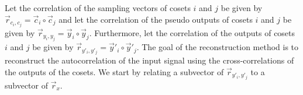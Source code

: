 \documentclass[a4paper, openany, oneside]{memoir}
\begin{document}
Let the correlation of the sampling vectors of cosets $i$ and $j$ be given by $\vec{r}_{c_i,c_j} = \vec{c}_i \circ \vec{c}_j$ and let the correlation of the pseudo outputs of cosets $i$ and $j$ be given by $\vec{r}_{y_i,y_j} = \vec{y}_i \circ \vec{y}_j$. Furthermore, let the correlation of the outputs of cosets $i$ and $j$ be given by $\vec{r}_{y'_i,y'_j} = \vec{y}'_i \circ \vec{y}'_j$. The goal of the reconstruction method is to reconstruct the autocorrelation of the input signal using the cross-correlations of the outputs of the cosets. We start by relating a subvector of $\vec{r}_{y'_i,y'_j}$ to a subvector of $\vec{r}_x$.

\begin{blockTheorem} \label{th:convolution-correlation}
     \nolinebreak
\end{blockTheorem}
\end{document}
